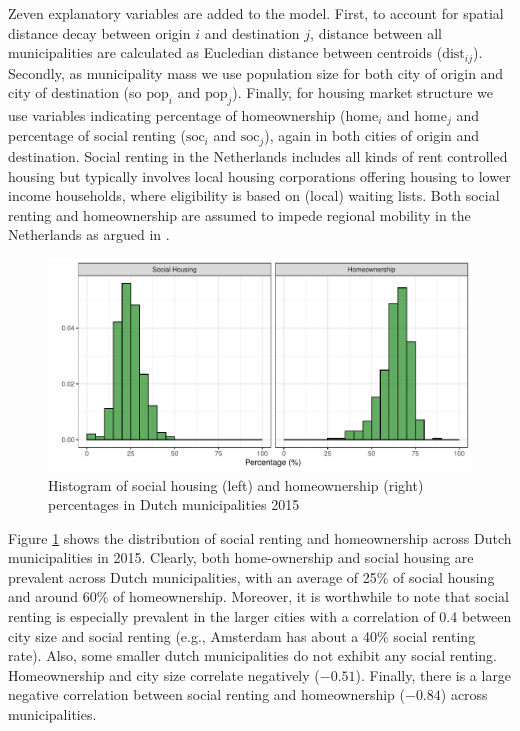 \documentclass[fleqn,10pt]{SelfArx} %
\begin{document}
        Zeven explanatory variables are added to the model. First, to account for
        spatial distance decay between origin $i$ and destination $j$,
        distance between all municipalities are calculated as
        Eucledian distance between centroids
        ($\text{dist}_{ij}$). Secondly, as municipality mass we use
        population size for both city of origin and city of
        destination (so $\text{pop}_i$ and $\text{pop}_j$). Finally,
        for housing market structure we use variables indicating
        percentage of homeownership ($\text{home}_i$ and
        $\text{home}_j$ and percentage of social renting
        ($\text{soc}_i$ and $\text{soc}_j$), again in both cities of
        origin and destination. Social renting in the Netherlands
        includes all kinds of rent controlled housing but typically
        involves local housing corporations offering housing to lower
        income households, where eligibility is based on (local)
        waiting lists. Both social renting and homeownership are
        assumed to impede regional mobility in the Netherlands as argued in
        \citet{de2009homeownership}.

        \begin{figure}[ht]\centering %
          \includegraphics[width=0.8\linewidth]{../fig/hist_housing.pdf}
          \caption{Histogram of social housing (left) and
            homeownership (right) percentages in Dutch municipalities
            2015}
            \label{fig:housing_mig}
        \end{figure}

        Figure \ref{fig:housing_mig} shows the distribution of social renting
        and homeownership across Dutch municipalities in 2015.  Clearly, both
        home-ownership and social housing are prevalent across Dutch
        municipalities, with an average of 25\% of social housing and around
        60\% of homeownership. Moreover, it is worthwhile to note that social
        renting is especially prevalent in the larger cities with a correlation
        of 0.4 between city size and social renting (e.g., Amsterdam has about a
        40\% social renting rate). Also, some smaller dutch municipalities do
        not exhibit any social renting. Homeownership and city size correlate
        negatively ($-0.51$). Finally, there is a large negative correlation
        between social renting and homeownership ($-0.84$) across
        municipalities.
        
\end{document}
